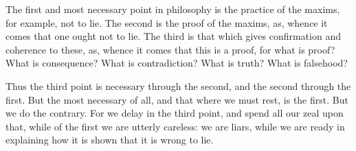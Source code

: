 The first and most necessary point in philosophy is the practice of the maxims,
for example, not to  lie. The second is the proof of the  maxims, as, whence it
comes that one ought not to lie. The third is that which gives confirmation and
coherence to  these, as,  whence it  comes that this  is a  proof, for  what is
proof?  What is  consequence? What  is contradiction?  What is  truth? What  is
falsehood?

Thus the  third point is necessary  through the second, and  the second through
the first. But the  most necessary of all, and that where we  must rest, is the
first. But we do  the contrary. For we delay in the third  point, and spend all
our zeal upon that,  while of the first we are utterly  careless: we are liars,
while we are ready in explaining how it is shown that it is wrong to lie.
